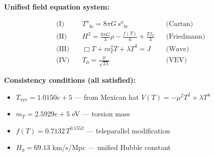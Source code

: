 
\textbf{Unified field equation system:}

\begin{align}
  \text{(I)} \quad & T^a{}_{bc} = 8\pi G \, s^a{}_{bc} && \text{(Cartan)} \\
  \text{(II)} \quad & H^2 = \frac{8\pi G}{3}\rho - \frac{f(T)}{6} + \frac{Tf_T}{3} && \text{(Friedmann)} \\
  \text{(III)} \quad & \Box T + m_T^2 T + \lambda T^3 = J && \text{(Wave)} \\
  \text{(IV)} \quad & T_0 = \frac{\mu}{\sqrt{2\lambda}} && \text{(VEV)}
\end{align}

\textbf{Consistency conditions (all satisfied):}
\begin{itemize}
  \item $T_{\text{vev}} = 1.0150e+5$ — from Mexican hat $V(T) = -\mu^2 T^2 + \lambda T^4$
  \item $m_T = 2.5929e+5$ eV — torsion mass
  \item $f(T) = 0.7132 \, T^{0.1552}$ — teleparallel modification
  \item $H_0 = 69.13$ km/s/Mpc — unified Hubble constant
\end{itemize}